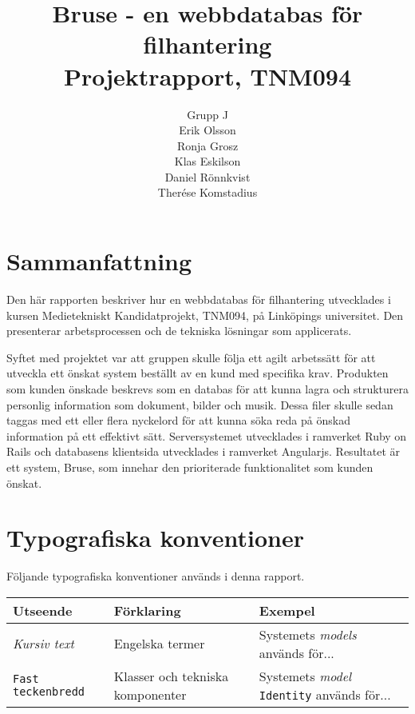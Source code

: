\documentclass[a4paper,12pt,oneside,final]{extbook}
\title{Bruse - en webbdatabas för filhantering\\Projektrapport, TNM094}
\author{Grupp J\\Erik Olsson\\Ronja Grosz\\Klas Eskilson\\Daniel Rönnkvist\\Therése Komstadius}
\begin{document}
\pagestyle{empty}
\thispagestyle{empty}

\frontmatter

\maketitle

\pagestyle{fancy}

\chapter{Sammanfattning}
Den här rapporten beskriver hur en webbdatabas för filhantering utvecklades i kursen Medietekniskt Kandidatprojekt, TNM094, på Linköpings universitet. Den presenterar arbetsprocessen och de tekniska lösningar som applicerats.

Syftet med projektet var att gruppen skulle följa ett agilt arbetssätt för att utveckla ett önskat system beställt av en kund med specifika krav. Produkten som kunden önskade beskrevs som en databas för att kunna lagra och strukturera personlig information som dokument, bilder och musik. Dessa filer skulle sedan taggas med ett eller flera nyckelord för att kunna söka reda på önskad information på ett effektivt sätt. Serversystemet utvecklades i ramverket Ruby on Rails och databasens klientsida utvecklades i ramverket Angularjs. Resultatet är ett system, Bruse, som innehar den prioriterade funktionalitet som kunden önskat.

\tableofcontents

\cleardoublepage
{}
\listoffigures

\cleardoublepage
{}
\listoftables

\chapter{Typografiska konventioner}
Följande typografiska konventioner används i denna rapport.

\begin{table}[h]
  \begin{centering}
    \begin{tabular}{|l|l|l|}
    \hline
    \textbf{Utseende} & \textbf{Förklaring} & \textbf{Exempel} \\
    \hline
    \emph{Kursiv text} & Engelska termer & Systemets \emph{models} används för... \\
    \hline
    \texttt{Fast teckenbredd} & Klasser och tekniska komponenter & Systemets \emph{model} \texttt{Identity} används för... \\
    \hline
    \end{tabular}
    \label{table:type}
  \end{centering}
\end{table}
\end{document}
